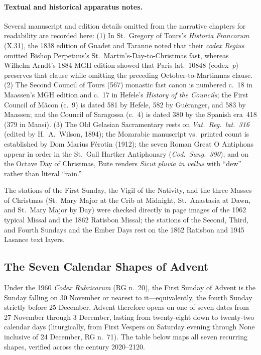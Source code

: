 \paragraph{Textual and historical apparatus notes.}
Several manuscript and edition details omitted from the narrative chapters for
readability are recorded here: (1) In St.~Gregory of Tours's \textit{Historia
Francorum} (X.31), the 1838 edition of Guadet and Taranne noted that their
\textit{codex Regius} omitted Bishop Perpetuus's St.~Martin's-Day-to-Christmas
fast, whereas Wilhelm Arndt's 1884 MGH edition showed that Paris lat.~10848
(codex~\textit{p}) preserves that clause while omitting the preceding
October-to-Martinmas clause. (2) The Second Council of Tours (567) monastic
fast canon is numbered c.~18 in Maassen's MGH edition and c.~17 in Hefele's
\textit{History of the Councils}; the First Council of M\^acon (c.~9) is dated
581 by Hefele, 582 by Gu\'eranger, and 583 by Maassen; and the Council of
Saragossa (c.~4) is dated 380 by the Spanish era~418 (379 in Mansi). (3) The
Old Gelasian Sacramentary rests on \textit{Vat.\ Reg.\ lat.\ 316} (edited by
H.~A.~Wilson, 1894); the Mozarabic manuscript vs.\ printed count is established
by Dom Marius F\'erotin (1912); the seven Roman Great O Antiphons appear in
order in the St.~Gall Hartker Antiphonary (\textit{Cod.\ Sang.\ 390}); and on
the Octave Day of Christmas, Bute renders \textit{Sicut pluvia in vellus} with
``dew'' rather than literal ``rain.''

The stations of the First Sunday, the Vigil of the Nativity, and the three
Masses of Christmas (St.~Mary Major at the Crib at Midnight, St.~Anastasia at
Dawn, and St.~Mary Major by Day) were checked directly in page images of the
1962 typical Missal and the 1862 Ratisbon Missal; the stations of the Second,
Third, and Fourth Sundays and the Ember Days rest on the 1862 Ratisbon and
1945 Lasance text layers.

\subsection{The Seven Calendar Shapes of Advent}

Under the 1960 \textit{Codex Rubricarum} (RG n.~20), the First Sunday of Advent
is the Sunday falling on 30 November or nearest to it---equivalently, the fourth
Sunday strictly before 25 December. Advent therefore opens on one of seven dates
from 27 November through 3 December, lasting from twenty-eight down to
twenty-two calendar days (liturgically, from First Vespers on Saturday evening
through None inclusive of 24 December, RG n.~71). The table below maps all
seven recurring shapes, verified across the century 2020--2120.

